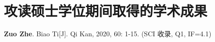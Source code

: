 \chapter{攻读硕士学位期间取得的学术成果}

\setlength{\parindent}{0pt} %

\begin{enumerate}[label={[\arabic*]}, leftmargin=9.5mm]
    \item \hspace{5pt}\textbf{Zuo Zhe}. Biao Ti[J]. Qi Kan, 2020, 60: 1-15. (SCI 收录, Q1, IF=4.1)
\end{enumerate}
\setlength{\parindent}{2em} %
